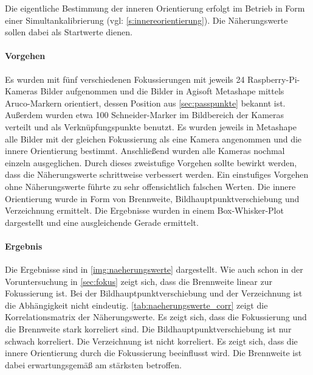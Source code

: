 \documentclass[./00PhotoBox.tex]{subfiles}
\begin{document}
Die eigentliche Bestimmung der inneren Orientierung erfolgt im Betrieb in Form einer Simultankalibrierung (vgl: \autoref{s:innereorientierung}). Die Näherungswerte sollen dabei als Startwerte dienen.

\paragraph{Vorgehen}

Es wurden mit fünf verschiedenen Fokussierungen mit jeweils 24 Raspberry-Pi-Kameras Bilder aufgenommen und die Bilder in Agisoft Metashape mittels Aruco-Markern orientiert, dessen Position aus \autoref{sec:passpunkte} bekannt ist. Außerdem wurden etwa 100 Schneider-Marker im Bildbereich der Kameras verteilt und als Verknüpfungspunkte benutzt. Es wurden jeweils in Metashape alle Bilder mit der gleichen Fokussierung als eine Kamera angenommen und die innere Orientierung bestimmt. Anschließend wurden alle Kameras nochmal einzeln ausgeglichen. Durch dieses zweistufige Vorgehen sollte bewirkt werden, dass die Näherungswerte schrittweise verbessert werden. Ein einstufiges Vorgehen ohne Näherungswerte führte zu sehr offensichtlich falschen Werten. Die innere Orientierung wurde in Form von Brennweite, Bildhauptpunktverschiebung und Verzeichnung ermittelt. Die Ergebnisse wurden in einem Box-Whisker-Plot dargestellt und eine ausgleichende Gerade ermittelt.

\paragraph{Ergebnis}

Die Ergebnisse sind in \autoref{img:naeherungswerte} dargestellt. Wie auch schon in der Voruntersuchung in \autoref{sec:fokus} zeigt sich, dass die Brennweite linear zur Fokussierung ist. Bei der Bildhauptpunktverschiebung und der Verzeichnung ist die Abhängigkeit nicht eindeutig. \autoref{tab:naeherungswerte_corr} zeigt die Korrelationsmatrix der Näherungswerte. Es zeigt sich, dass die Fokussierung und die Brennweite stark korreliert sind. Die Bildhauptpunktverschiebung ist nur schwach korreliert. Die Verzeichnung ist nicht korreliert. Es zeigt sich, dass die innere Orientierung durch die Fokussierung beeinflusst wird. Die Brennweite ist dabei erwartungsgemäß am stärksten betroffen.
\end{document}
